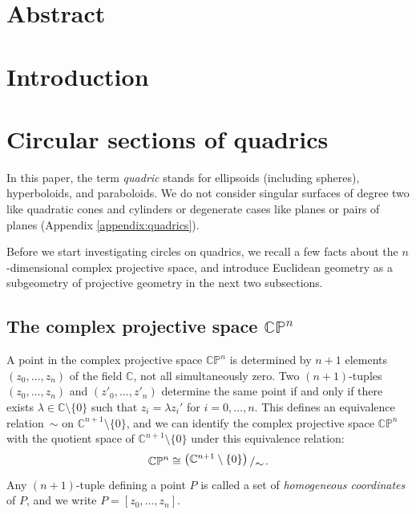 \documentclass[10pt, a4paper]{article}
\newcommand{\bigslant}[2]{{\raisebox{.2em}{$#1$}\left/\raisebox{-.2em}{$#2$}\right.}}
\theoremstyle{BoldTopSpacing}
\theoremstyle{BoldTopSpacing}
\theoremstyle{BoldTopSpacing}
\theoremstyle{BoldTopBottomSpacing}
\theoremstyle{BoldTopSpacing}
\theoremstyle{BoldTopBottomSpacing}
\theoremstyle{remark}
\begin{document}
\pagestyle{fancy}
\section*{Abstract}
\label{sec:abstract}

\pagebreak
\pagestyle{tocstyle}
\renewcommand{\contentsname}{Contents}
\tableofcontents
\pagebreak
\listoffigures
\pagebreak
\pagestyle{fancy}
\section{Introduction}
\label{sec:introduction}
\pagebreak
\section{Circular sections of quadrics}
\label{sec:circular-sections-of-quadrics}

In this paper, the term \textit{quadric} stands for ellipsoids (including spheres), hyperboloids, and paraboloids. We do not consider singular surfaces of degree two like quadratic cones and cylinders or degenerate cases like planes or pairs of planes (Appendix \ref{appendix:quadrics}).

Before we start investigating circles on quadrics, we recall a few facts about the $n$-dimensional complex projective space, and introduce Euclidean geometry as a subgeometry of projective geometry in the next two subsections. \par

\subsection{The complex projective space $\mathbb{C}\mathbb{P}^n$}
\label{subsec:complex-projective-space}

A point in the complex projective space $\mathbb{C}\mathbb{P}^{n}$ is determined by $n + 1$ elements $(z_{0}, \dots, z_{n})$ of the field $\mathbb{C}$, not all simultaneously zero. Two $(n + 1)$-tuples $(z_{0}, \dots, z_{n})$ and $(z'_{0}, \dots, z'_{n})$ determine the same point if and only if there exists $\lambda \in \mathbb{C} \setminus \{ 0 \}$ such that $z_{i} = \lambda z_{i}'$ for $i = 0, \dots, n$. This defines an equivalence relation~$\sim$ on $\mathbb{C}^{n + 1} \setminus \{ 0 \}$, and we can identify the complex projective space $\mathbb{C}\mathbb{P}^n$ with the quotient space of $\mathbb{C}^{n + 1} \setminus \{ 0 \}$ under this equivalence relation:
\[
    \mathbb{C}\mathbb{P}^n \cong \bigslant{\left( \mathbb{C}^{n + 1} \setminus \{ 0 \} \right)}{\sim}.
\]
Any $(n+1)$-tuple defining a point $P$ is called a set of \textit{homogeneous coordinates} of $P$, and we write $P = [z_{0},\dots, z_{n}]$.\par
\end{document}
